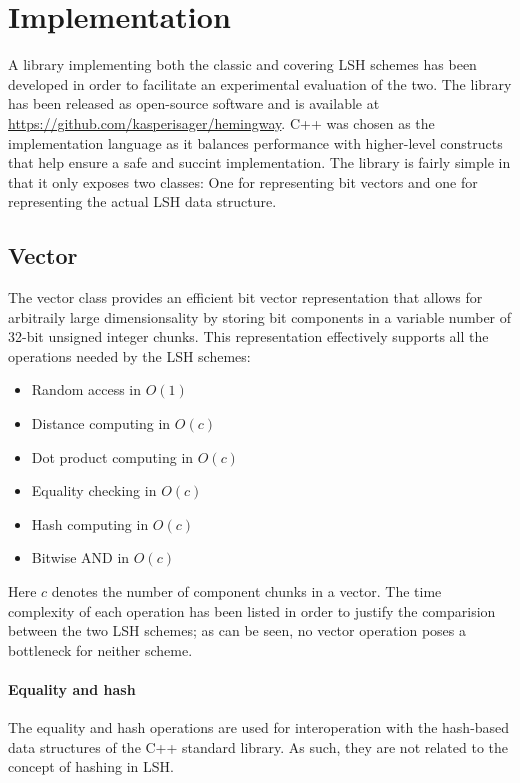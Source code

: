 \section{Implementation}
\label{implementation}

A library implementing both the classic and covering LSH schemes has been developed in order to facilitate an experimental evaluation of the two. The library has been released as open-source software and is available at \url{https://github.com/kasperisager/hemingway}. C++ was chosen as the implementation language as it balances performance with higher-level constructs that help ensure a safe and succint implementation. The library is fairly simple in that it only exposes two classes: One for representing bit vectors and one for representing the actual LSH data structure.

\subsection{Vector}

The vector class provides an efficient bit vector representation that allows for arbitraily large dimensionsality by storing bit components in a variable number of 32-bit unsigned integer chunks. This representation effectively supports all the operations needed by the LSH schemes:

\begin{itemize}
  \item Random access in $O(1)$
  \item Distance computing in $O(c)$
  \item Dot product computing in $O(c)$
  \item Equality checking in $O(c)$
  \item Hash computing in $O(c)$
  \item Bitwise AND in $O(c)$
\end{itemize}

Here $c$ denotes the number of component chunks in a vector. The time complexity of each operation has been listed in order to justify the comparision between the two LSH schemes; as can be seen, no vector operation poses a bottleneck for neither scheme.

\paragraph{Equality and hash} The equality and hash operations are used for interoperation with the hash-based data structures of the C++ standard library. As such, they are not related to the concept of hashing in LSH.

